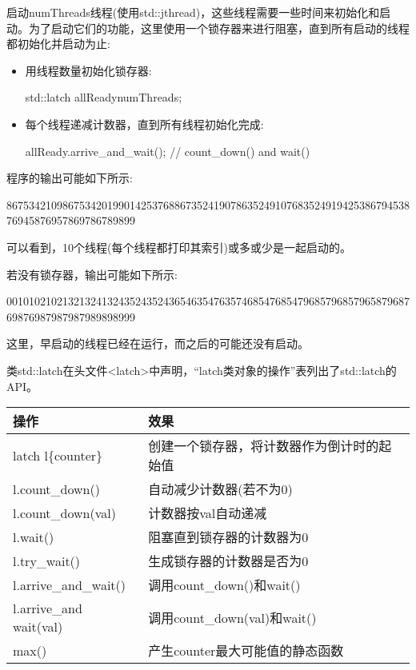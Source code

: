 启动numThreads线程(使用std::jthread)，这些线程需要一些时间来初始化和启动。为了启动它们的功能，这里使用一个锁存器来进行阻塞，直到所有启动的线程都初始化并启动为止:

\begin{itemize}
\item
用线程数量初始化锁存器:

\begin{cpp}
std::latch allReady{numThreads};
\end{cpp}

\item
每个线程递减计数器，直到所有线程初始化完成:

\begin{cpp}
allReady.arrive_and_wait(); // count_down() and wait()
\end{cpp}

\end{itemize}

程序的输出可能如下所示:

\begin{shell}
86753421098675342019901425376886735241907863524910768352491942538679453876945876957869786789899
\end{shell}

可以看到，10个线程(每个线程都打印其索引)或多或少是一起启动的。

若没有锁存器，输出可能如下所示:

\begin{shell}
00101021021321324132435243524365463547635746854768547968579685796587968769876987987987989898999
\end{shell}

这里，早启动的线程已经在运行，而之后的可能还没有启动。


类std::latch在头文件<latch>中声明，“latch类对象的操作”表列出了std::latch的API。

\begin{longtable}[c]{|l|l|}
\hline
\textbf{操作}      & \textbf{效果}                              \\ \hline
\endfirsthead
%
\endhead
%
latch l\{counter\} & 创建一个锁存器，将计数器作为倒计时的起始值 \\ \hline
l.count\_down()    & 自动减少计数器(若不为0)                     \\ \hline
l.count\_down(val)      & 计数器按val自动递减     \\ \hline
l.wait()                & 阻塞直到锁存器的计数器为0   \\ \hline
l.try\_wait()           & 生成锁存器的计数器是否为0 \\ \hline
l.arrive\_and\_wait()   & 调用count\_down()和wait()               \\ \hline
l.arrive\_and wait(val) & 调用count\_down(val)和wait()            \\ \hline
max()              & 产生counter最大可能值的静态函数   \\ \hline
\end{longtable}

